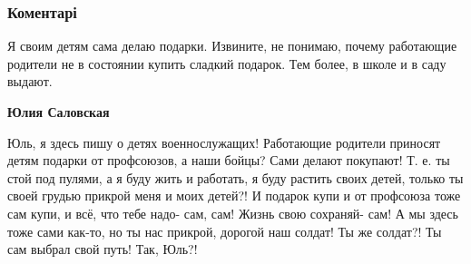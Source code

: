  
 
 
 
 
\subsubsection{Коментарі}

\begin{itemize} %

Я своим детям сама делаю подарки. Извините, не понимаю, почему работающие
родители не в состоянии купить сладкий подарок. Тем более, в школе и в саду
выдают.

\textbf{Юлия Саловская} 

Юль, я здесь пишу о детях военнослужащих! Работающие родители приносят детям
подарки от профсоюзов, а наши бойцы? Сами делают покупают! Т. е. ты стой под
пулями, а я буду жить и работать, я буду растить своих детей, только ты своей
грудью прикрой меня и моих детей?! И подарок купи и от профсоюза тоже сам купи,
и всё, что тебе надо- сам, сам! Жизнь свою сохраняй- сам! А мы здесь тоже сами
как-то, но ты нас прикрой, дорогой наш солдат! Ты же солдат?! Ты сам выбрал
свой путь! Так, Юль?!

\end{itemize} %
